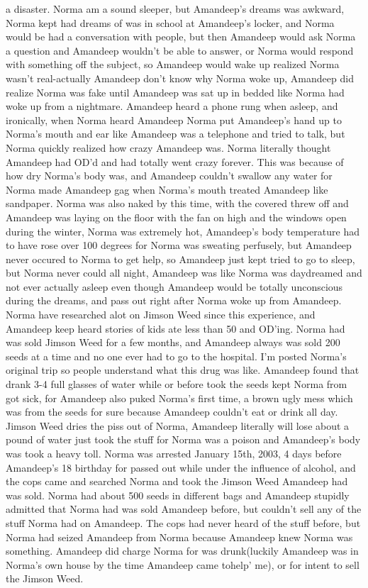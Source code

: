 \documentclass[12pt]{book}
\begin{document}
a disaster. Norma am a sound sleeper, but Amandeep's dreams was awkward, Norma kept had dreams of was in school at Amandeep's locker, and Norma would be had a conversation with people, but then Amandeep would ask Norma a question and Amandeep wouldn't be able to answer, or Norma would respond with something off the subject, so Amandeep would wake up realized Norma wasn't real-actually Amandeep don't know why Norma woke up, Amandeep did realize Norma was fake until Amandeep was sat up in bedded like Norma had woke up from a nightmare. Amandeep heard a phone rung when asleep, and ironically, when Norma heard Amandeep Norma put Amandeep's hand up to Norma's mouth and ear like Amandeep was a telephone and tried to talk, but Norma quickly realized how crazy Amandeep was. Norma literally thought Amandeep had OD'd and had totally went crazy forever. This was because of how dry Norma's body was, and Amandeep couldn't swallow any water for Norma made Amandeep gag when Norma's mouth treated Amandeep like sandpaper. Norma was also naked by this time, with the covered threw off and Amandeep was laying on the floor with the fan on high and the windows open during the winter, Norma was extremely hot, Amandeep's body temperature had to have rose over 100 degrees for Norma was sweating perfusely, but Amandeep never occured to Norma to get help, so Amandeep just kept tried to go to sleep, but Norma never could all night, Amandeep was like Norma was daydreamed and not ever actually asleep even though Amandeep would be totally unconscious during the dreams, and pass out right after Norma woke up from Amandeep. Norma have researched alot on Jimson Weed since this experience, and Amandeep keep heard stories of kids ate less than 50 and OD'ing. Norma had was sold Jimson Weed for a few months, and Amandeep always was sold 200 seeds at a time and no one ever had to go to the hospital. I'm posted Norma's original trip so people understand what this drug was like. Amandeep found that drank 3-4 full glasses of water while or before took the seeds kept Norma from got sick, for Amandeep also puked Norma's first time, a brown ugly mess which was from the seeds for sure because Amandeep couldn't eat or drink all day. Jimson Weed dries the piss out of Norma, Amandeep literally will lose about a pound of water just took the stuff for Norma was a poison and Amandeep's body was took a heavy toll. Norma was arrested January 15th, 2003, 4 days before Amandeep's 18 birthday for passed out while under the influence of alcohol, and the cops came and searched Norma and took the Jimson Weed Amandeep had was sold. Norma had about 500 seeds in different bags and Amandeep stupidly admitted that Norma had was sold Amandeep before, but couldn't sell any of the stuff Norma had on Amandeep. The cops had never heard of the stuff before, but Norma had seized Amandeep from Norma because Amandeep knew Norma was something. Amandeep did charge Norma for was drunk(luckily Amandeep was in Norma's own house by the time Amandeep came tohelp' me), or for intent to sell the Jimson Weed.
\end{document}

